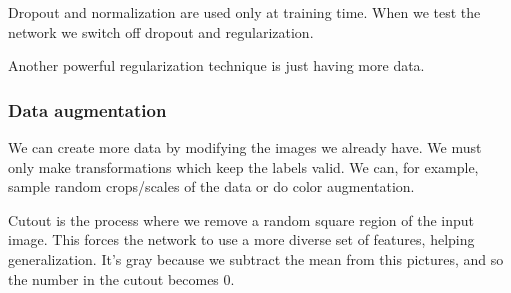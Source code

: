 \documentclass{article}
\begin{document}
Dropout and normalization are used only at training time.
When we test the network we switch off dropout and regularization.

Another powerful regularization technique is just having more data.

\subsubsection{Data augmentation}
We can create more data by modifying the images we already have.
We must only make transformations which keep the labels valid.
We can, for example, sample random crops/scales of the data or do color augmentation.

Cutout is the process where we remove a random square region of the input image.
This forces the network to use a more diverse set of features, helping generalization.
It's gray because we subtract the mean from this pictures, and so the number in the cutout becomes 0.
\end{document}
